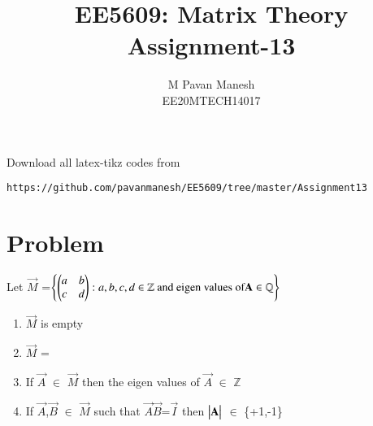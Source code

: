 \documentclass[journal,12pt,twocolumn]{IEEEtran}
\begin{document}
     \def\rightbox#1{\makebox[0in][r]{#1}}
     \def\centbox#1{\makebox[0in]{#1}}
     \def\topbox#1{\raisebox{-\baselineskip}[0in][0in]{#1}}
     \def\midbox#1{\raisebox{-0.5\baselineskip}[0in][0in]{#1}}
\vspace{3cm}
\title{EE5609: Matrix Theory\\
          Assignment-13\\}
\author{M Pavan Manesh\\
EE20MTECH14017 }
\maketitle
\newpage
\bigskip
\renewcommand{\thefigure}{\theenumi}
\renewcommand{\thetable}{\theenumi}
Download all latex-tikz codes from 
%
\begin{lstlisting}
https://github.com/pavanmanesh/EE5609/tree/master/Assignment13
\end{lstlisting}
%
\section{Problem}
Let $\vec{M}$ =$\left\{\begin{pmatrix}a&b\\c&d\end{pmatrix} : a,b,c,d \in \mathbb{Z} \text{ and eigen values of} \mathbf{A} \in \mathbb{Q}\right\}$ \label{main}
\begin{enumerate}
    \item $\vec{M}$ is empty
    \item $\vec{M}$ =
    \item If $\vec{A}$ $\in$ $\vec{M}$ then the eigen values of $\vec{A}$ $\in$ $\mathbb{Z}$
    \item If $\vec{A}$,$\vec{B}$ $\in$ $\vec{M}$ such that $\vec{A} \vec{B}$=$\vec{I}$ then $\begin{vmatrix}\mathbf{A}\end{vmatrix}$ $\in$ \{+1,-1\}
\end{enumerate}
\end{document}
